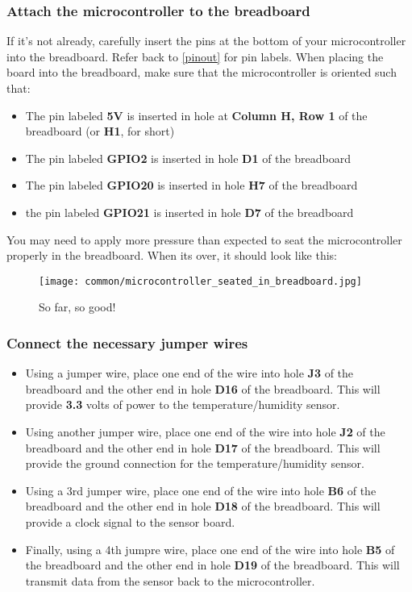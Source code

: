 \subsubsection{Attach the microcontroller to the breadboard}
If it's not already, carefully insert the pins at the bottom of your microcontroller into the breadboard. Refer back
to \ref{pinout} for pin labels. When placing the board into the breadboard, make sure that the microcontroller is oriented such that:
\begin{itemize}
    \item The pin labeled \textbf{5V} is inserted in hole at \textbf{Column H, Row 1} of the breadboard (or \textbf{H1}, for short)
    \item The pin labeled \textbf{GPIO2} is inserted in hole \textbf{D1} of the breadboard
    \item The pin labeled \textbf{GPIO20} is inserted in hole \textbf{H7} of the breadboard
    \item the pin labeled \textbf{GPIO21} is inserted in hole \textbf{D7} of the breadboard
\end{itemize}
You may need to apply more pressure than expected to seat the microcontroller properly in the breadboard. When its over, it should look like this:
\begin{figure}[H]
    \centering
    \texttt{[image: common/microcontroller\_seated\_in\_breadboard.jpg]}
    \caption{So far, so good!}
\end{figure}

\subsubsection{Connect the necessary jumper wires}
\begin{itemize}
    \item Using a jumper wire, place one end of the wire into hole \textbf{J3} of the breadboard and the other end in
    hole \textbf{D16} of the breadboard. This will provide \textbf{3.3} volts of power to the temperature/humidity sensor.
    \item Using another jumper wire, place one end of the wire into hole \textbf{J2} of the breadboard and the other
    end in hole \textbf{D17} of the breadboard. This will provide the ground connection for the temperature/humidity sensor.
    \item Using a 3rd jumper wire, place one end of the wire into hole \textbf{B6} of the breadboard and the other
    end in hole \textbf{D18} of the breadboard. This will provide a clock signal to the sensor board.
    \item Finally, using a 4th jumpre wire, place one end of the wire into hole \textbf{B5} of the breadboard and the other
    end in hole \textbf{D19} of the breadboard. This will transmit data from the sensor back to the microcontroller.
\end{itemize}

